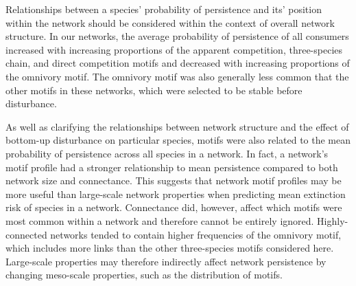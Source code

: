 \documentclass[12pt]{article}
\begin{document}
\begin{spacing}{2.0}
    
    
    
    
    
    Relationships between a species' probability of persistence and its' position within the network should be considered within the context of overall network structure.
    In our networks, the average probability of persistence of all consumers increased with increasing proportions of the apparent competition, three-species chain, and direct competition motifs and decreased with increasing proportions of the omnivory motif.
    The omnivory motif was also generally less common that the other motifs in these networks, which were selected to be stable before disturbance. 
    
    As well as clarifying the relationships between network structure and the effect of bottom-up disturbance on particular species, motifs were also related to the mean probability of persistence across all species in a network.
    In fact, a network's motif profile had a stronger relationship to mean persistence compared to both network size and connectance. 
    This suggests that network motif profiles may be more useful than large-scale network properties when predicting mean extinction risk of species in a network.
    Connectance did, however, affect which motifs were most common within a network and therefore cannot be entirely ignored. 
    Highly-connected networks tended to contain higher frequencies of the omnivory motif, which includes more links than the other three-species motifs considered here.
    Large-scale properties may therefore indirectly affect network persistence by changing meso-scale properties, such as the distribution of motifs. 
    

\end{spacing}
\end{document}
